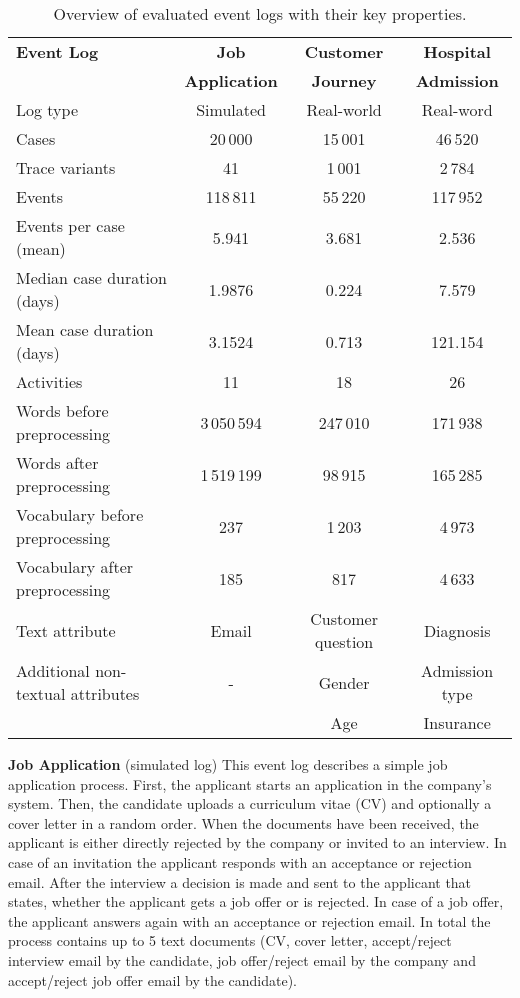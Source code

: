 \begin{table}[!htbp]
	\setlength\tabcolsep{5pt}
	\begin{tabularx}{\textwidth}{l c c c}
		\toprule
		\textbf{Event Log} & \textbf{Job} & \textbf{Customer} & \textbf{Hospital}  \\
		& \textbf{Application} & \textbf{Journey} &\textbf{Admission}  \\
		\midrule
		Log type & Simulated & Real-world & Real-word\\
		Cases & 20\,000& 15\,001& 46\,520\\
		Trace variants &41 & 1\,001 &2\,784 \\
		Events & 118\,811 & 55\,220 & 117\,952\\
		Events per case (mean) & 5.941& 3.681& 2.536\\
		Median case duration (days) & 1.9876 & 0.224& 7.579\\
		Mean case duration (days)& 3.1524 &  0.713 & 121.154\\
		Activities & 11 & 18 & 26\\
		Words before preprocessing & 3\,050\,594 &247\,010 &  171\,938\\
		Words after preprocessing  &1\,519\,199 &98\,915 & 165\,285\\
		Vocabulary before preprocessing & 237 & 1\,203 & 4\,973 \\
		Vocabulary after preprocessing & 185 & 817 & 4\,633\\
		Text attribute & Email& Customer question & Diagnosis\\
		Additional non-textual attributes & - & Gender& Admission type\\
		&  & Age& Insurance\\
		\bottomrule
	\end{tabularx}
	\caption[Overview of evaluated event logs]{Overview of evaluated event logs with their key properties.}
	\label{tab:logs}
\end{table}

\textbf{Job Application} (simulated log) This event log describes a simple job application process. 
First, the applicant starts an application in the company's system.
Then, the candidate uploads a curriculum vitae (CV) and optionally a cover letter in a random order.
When the documents have been received, the applicant is either directly rejected by the company or invited to an interview.
In case of an invitation the applicant responds with an acceptance or rejection email.
After the interview a decision is made and sent to the applicant that states, whether the applicant gets a job offer or is rejected.
In case of a job offer, the applicant answers again with an acceptance or rejection email.
In total the process contains up to 5 text documents (CV, cover letter, accept/reject interview email by the candidate, job offer/reject email by the company and accept/reject job offer email by the candidate).

